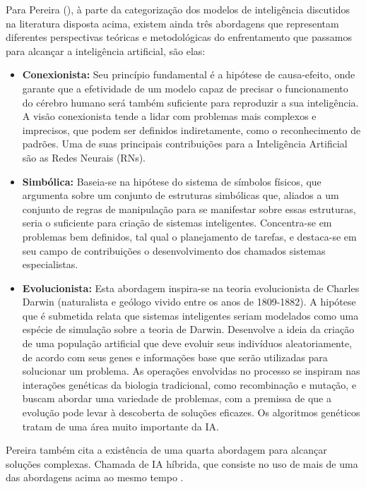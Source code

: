 Para Pereira (\citeyear{Pereira}), à parte da categorização dos modelos de inteligência discutidos na literatura disposta acima, existem ainda três abordagens que representam diferentes perspectivas teóricas e metodológicas do enfrentamento que passamos para alcançar a inteligência artificial, são elas:
\begin{itemize}
    \item \textbf{Conexionista:} Seu princípio fundamental é a hipótese de causa-efeito, onde garante que a efetividade de um modelo capaz de precisar o funcionamento do cérebro humano será também suficiente para reproduzir a sua inteligência. A visão conexionista tende a lidar com problemas mais complexos e imprecisos, que podem ser definidos indiretamente, como o reconhecimento de padrões. Uma de suas principais contribuições para a Inteligência Artificial são as Redes Neurais (RNs).
\end{itemize}
\begin{itemize}
    \item \textbf{Simbólica:} Baseia-se na hipótese do sistema de símbolos físicos, que argumenta sobre um conjunto de estruturas simbólicas que, aliados a um conjunto de regras de manipulação para se manifestar sobre essas estruturas, seria o suficiente para criação de sistemas inteligentes. Concentra-se em problemas bem definidos, tal qual o planejamento de tarefas, e destaca-se em seu campo de contribuições o desenvolvimento dos chamados sistemas especialistas.
\end{itemize}
\begin{itemize}
    \item \textbf{Evolucionista:} Esta abordagem inspira-se na teoria evolucionista de Charles Darwin (naturalista e geólogo vivido entre os anos de 1809-1882). A hipótese que é submetida relata que sistemas inteligentes seriam modelados como uma espécie de simulação sobre a teoria de Darwin. Desenvolve a ideia da criação de uma população artificial que deve evoluir seus indivíduos aleatoriamente, de acordo com seus genes e informações base que serão utilizadas para solucionar um problema. As operações envolvidas no processo se inspiram nas interações genéticas da biologia tradicional, como recombinação e mutação, e buscam abordar uma variedade de problemas, com a premissa de que a evolução pode levar à descoberta de soluções eficazes. Os algoritmos genéticos tratam de uma área muito importante da IA.
\end{itemize}

Pereira também cita a existência de uma quarta abordagem para alcançar soluções complexas. Chamada de IA híbrida, que consiste no uso de mais de uma das abordagens acima ao mesmo tempo \cite{Pereira}.

